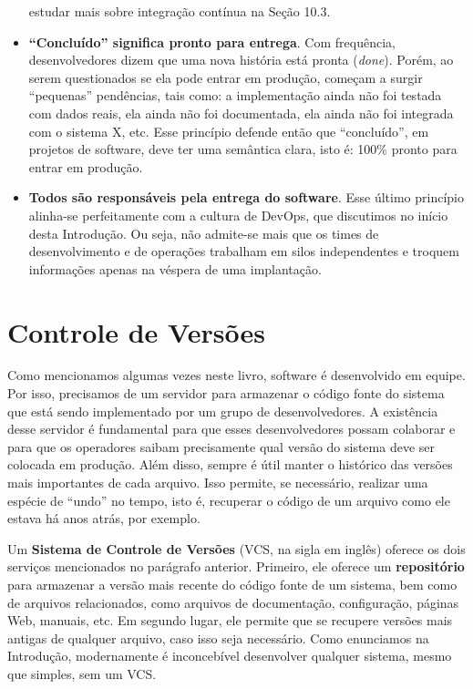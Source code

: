 \documentclass[
  11pt,
  twoside]{book}
\begin{document}
\begin{itemize}
  estudar mais sobre integração contínua na Seção 10.3.
\item
  \textbf{``Concluído'' significa pronto para entrega}. Com frequência,
  desenvolvedores dizem que uma nova história está pronta (\emph{done}).
  Porém, ao serem questionados se ela pode entrar em produção, começam a
  surgir ``pequenas'' pendências, tais como: a implementação ainda não
  foi testada com dados reais, ela ainda não foi documentada, ela ainda
  não foi integrada com o sistema X, etc. Esse princípio defende então
  que ``concluído'', em projetos de software, deve ter uma semântica
  clara, isto é: 100\% pronto para entrar em produção.
\item
  \textbf{Todos são responsáveis pela entrega do software}. Esse último
  princípio alinha-se perfeitamente com a cultura de DevOps, que
  discutimos no início desta Introdução. Ou seja, não admite-se mais que
  os times de desenvolvimento e de operações trabalham em silos
  independentes e troquem informações apenas na véspera de uma
  implantação.
\end{itemize}

\hypertarget{controle-de-versuxf5es}{%
\section{Controle de Versões}\label{controle-de-versuxf5es}}


Como mencionamos algumas vezes neste livro, software é desenvolvido em
equipe. Por isso, precisamos de um servidor para armazenar o código
fonte do sistema que está sendo implementado por um grupo de
desenvolvedores. A existência desse servidor é fundamental para que
esses desenvolvedores possam colaborar e para que os operadores saibam
precisamente qual versão do sistema deve ser colocada em produção. Além
disso, sempre é útil manter o histórico das versões mais importantes de
cada arquivo. Isso permite, se necessário, realizar uma espécie de
``undo'' no tempo, isto é, recuperar o código de um arquivo como ele
estava há anos atrás, por exemplo.

 Um \textbf{Sistema de Controle
de Versões} (VCS, na sigla em inglês) oferece os dois serviços
mencionados no parágrafo anterior. Primeiro, ele oferece um
\textbf{repositório} para armazenar a versão mais recente do código
fonte de um sistema, bem como de arquivos relacionados, como arquivos de
documentação, configuração, páginas Web, manuais, etc. Em segundo lugar,
ele permite que se recupere versões mais antigas de qualquer arquivo,
caso isso seja necessário. Como enunciamos na Introdução, modernamente é
inconcebível desenvolver qualquer sistema, mesmo que simples, sem um
VCS.
\end{document}
